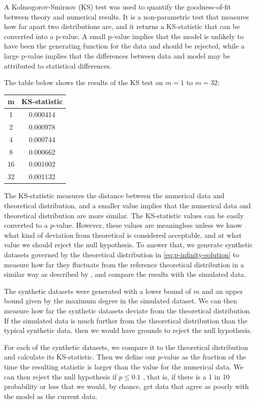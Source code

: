 A Kolmogorov-Smirnov (KS) test was used to quantify the goodness-of-fit between theory and numerical results. It is a non-parametric test that measures how far apart two distributions are, and it returns a KS-statistic that can be converted into a p-value. A small p-value implies that the model is unlikely to have been the generating function for the data and should be rejected, while a large p-value implies that the differences between data and model may be attributed to statistical differences. 

The table below shows the results of the KS test on $m = 1$ to $m=32$:

\begin{center}
\begin{tabular}{ c | c }
 m &  KS-statistic \\ 
 \hline
 1 & 0.000414 \\  
 2 & 0.000978 \\
 4 & 0.000744 \\
 8 & 0.000662 \\
 16 & 0.001002 \\
 32 & 0.001132 \\  
\end{tabular}
\label{table:ks-test}
\end{center}

The KS-statistic measures the distance between the numerical data and theoretical distribution, and a smaller value implies that the numerical data and theoretical distribution are more similar. The KS-statistic values can be easily converted to a $p$-value. However, these values are meaningless unless we know what kind of deviation from theoretical is considered acceptable, and at what value we should reject the null hypothesis. To answer that, we generate synthetic datasets governed by the theoretical distribution in \autoref{eq:p-infinity-solution} to measure how far they fluctuate from the reference theoretical distribution in a similar way as described by \citet{Clauset2009}, and compare the results with the simulated data. 

The synthetic datasets were generated with a lower bound of $m$ and an upper bound given by the maximum degree in the simulated dataset. We can then measure how far the synthetic datasets deviate from the theoretical distribution. If the simulated data is much further from the theoretical distribution than the typical synthetic data, then we would have grounds to reject the null hypothesis. 

For each of the synthetic datasets, we compare it to the theoretical distribution and calculate its KS-statistic. Then we define our $p$-value as the fraction of the time the resulting statistic is larger than the value for the numerical data. We can then reject the null hypothesis if $p \leq 0.1$ \citep{Clauset2009}, that is, if there is a 1 in 10 probability or less that we would, by chance, get data that agree as poorly with the model as the current data. 

